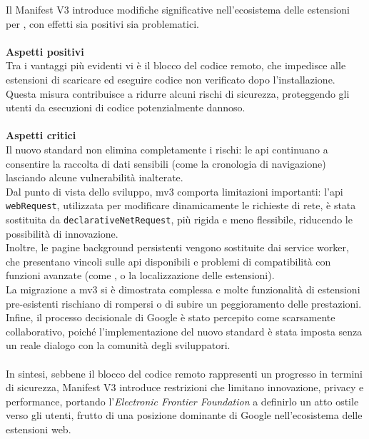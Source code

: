 \noindent Il Manifest V3 introduce modifiche significative nell’ecosistema delle estensioni per , con effetti sia positivi sia problematici.\\
\\
\textbf{Aspetti positivi}\\
Tra i vantaggi più evidenti vi è il blocco del codice remoto, che impedisce alle estensioni di scaricare ed eseguire codice non verificato dopo l’installazione. Questa misura contribuisce a ridurre alcuni rischi di sicurezza, proteggendo gli utenti da esecuzioni di codice potenzialmente dannoso.\\
\\
\textbf{Aspetti critici}\\
Il nuovo standard non elimina completamente i rischi: le \acrshort{api} continuano a consentire la raccolta di dati sensibili (come la cronologia di navigazione) lasciando alcune vulnerabilità inalterate. \\Dal punto di vista dello sviluppo, \acrshort{mv3} comporta limitazioni importanti: l'\acrshort{api} \texttt{webRequest}, utilizzata per modificare dinamicamente le richieste di rete, è stata sostituita da \texttt{declarativeNetRequest}, più rigida e meno flessibile, riducendo le possibilità di innovazione. \\Inoltre, le pagine background persistenti vengono sostituite dai service worker, che presentano vincoli sulle \acrshort{api} disponibili e problemi di compatibilità con funzioni avanzate (come ,  o la localizzazione delle estensioni). 
\\La migrazione a \acrshort{mv3} si è dimostrata complessa e molte funzionalità di estensioni pre-esistenti rischiano di rompersi o di subire un peggioramento delle prestazioni. Infine, il processo decisionale di Google è stato percepito come scarsamente collaborativo, poiché l’implementazione del nuovo standard è stata imposta senza un reale dialogo con la comunità degli sviluppatori. \cite{site:mv3-eff}\\
\\
In sintesi, sebbene il blocco del codice remoto rappresenti un progresso in termini di sicurezza, Manifest V3 introduce restrizioni che limitano innovazione, privacy e performance, portando l’\textit{Electronic Frontier Foundation} a definirlo un atto ostile verso gli utenti, frutto di una posizione dominante di Google nell’ecosistema delle estensioni web.

